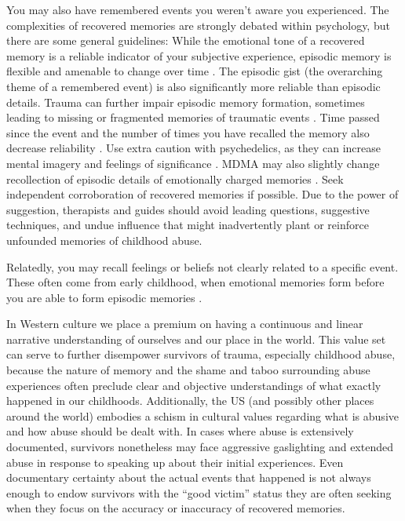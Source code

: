 \documentclass[12pt,letterpaper]{book}
\begin{document}
You may also have remembered events you weren't aware you experienced. The complexities of recovered memories are strongly debated within psychology, but there are some general guidelines: While the emotional tone of a recovered memory is a reliable indicator of your subjective experience, episodic memory is flexible and amenable to change over time \cite{reynaFuzzyTrace}. The episodic gist (the overarching theme of a remembered event) is also significantly more reliable than episodic details. Trauma can further impair episodic memory formation, sometimes leading to missing or fragmented memories of traumatic events \cite{vanderKolkBody}. Time passed since the event and the number of times you have recalled the memory also decrease reliability \cite{laneReconsolidation}. Use extra caution with psychedelics, as they can increase mental imagery and feelings of significance \cite{griffithsSignificance,araujoImagery}. MDMA may also slightly change recollection of episodic details of emotionally charged memories \cite{dossRecollection}. Seek independent corroboration of recovered memories if possible. Due to the power of suggestion, therapists and guides should avoid leading questions, suggestive techniques, and undue influence that might inadvertently plant or reinforce unfounded memories of childhood abuse.

Relatedly, you may recall feelings or beliefs not clearly related to a specific event. These often come from early childhood, when emotional memories form before you are able to form episodic memories \cite{brownAttachmentDisturbances}.

In Western  culture we place a premium on having a continuous and linear narrative understanding of ourselves and our place in the world. This value set can serve to further disempower survivors of trauma, especially childhood abuse, because the nature of memory and the shame and taboo surrounding abuse experiences often preclude clear and objective understandings of what exactly happened in our childhoods.  Additionally, the US (and possibly other places around the world) embodies a schism in cultural values regarding what is abusive and how abuse should be dealt with. In cases where abuse is extensively documented, survivors nonetheless may face aggressive gaslighting and extended abuse in response to speaking up about their initial experiences. Even documentary certainty about the actual events that happened is not always enough to endow survivors with the “good victim” status they are often seeking when they focus on the accuracy or inaccuracy of recovered memories.
\end{document}
